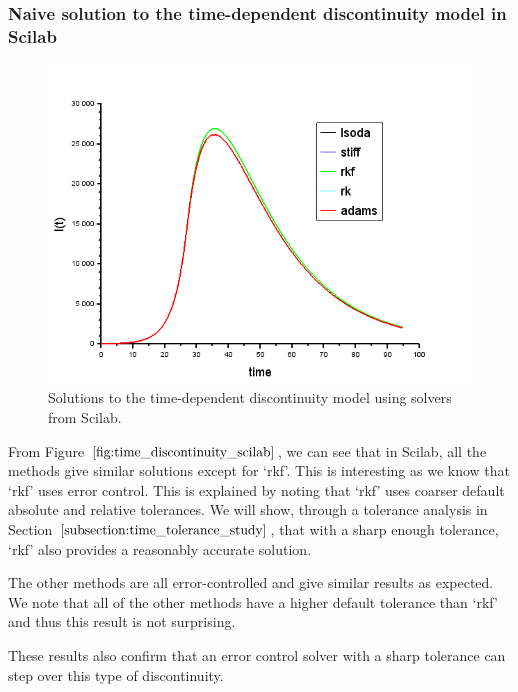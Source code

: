 \subsubsection{Naive solution to the time-dependent discontinuity model in Scilab}
\begin{figure}[H]
\centering
\includegraphics[width=0.7\linewidth]{./figures/time_discontinuity_scilab}
\caption{Solutions to the time-dependent discontinuity model using solvers from Scilab.}
\label{fig:time_discontinuity_scilab}
\end{figure}
From Figure $\ref{fig:time_discontinuity_scilab}$, we can see that in Scilab, all the methods give similar solutions except for `rkf'. This is interesting as we know that `rkf' uses error control. This is explained by noting that `rkf' uses coarser default absolute and relative tolerances. We will show, through a tolerance analysis in Section $\ref{subsection:time_tolerance_study}$, that with a sharp enough tolerance, `rkf' also provides a reasonably accurate solution.

The other methods are all error-controlled and give similar results as expected. We note that all of the other methods have a higher default tolerance than `rkf' and thus this result is not surprising.

These results also confirm that an error control solver with a sharp tolerance can step over this type of discontinuity.

